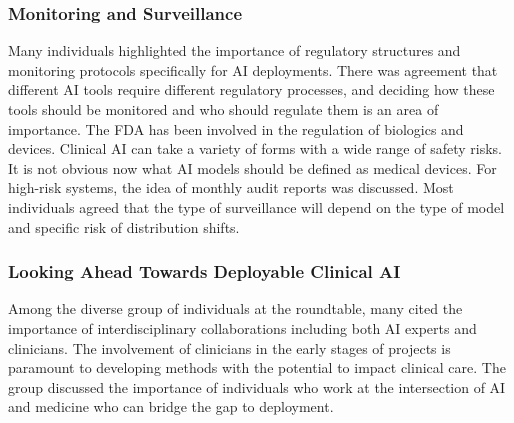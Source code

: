 \subsubsection{Monitoring and Surveillance}
Many individuals highlighted the importance of regulatory structures and monitoring protocols specifically for AI deployments. There was agreement that different AI tools require different regulatory processes, and deciding how these tools should be monitored and who should regulate them is an area of importance.  The FDA has been involved in the regulation of biologics and devices. Clinical AI can take a variety of forms with a wide range of safety risks. It is not obvious now what AI models should be defined as medical devices. For high-risk systems, the idea of monthly audit reports was discussed. Most individuals agreed that the type of surveillance will depend on the type of model and specific risk of distribution shifts. 

  
\subsubsection{Looking Ahead Towards Deployable Clinical AI}
Among the diverse group of individuals at the roundtable, many cited the importance of interdisciplinary collaborations including both AI experts and clinicians. The involvement of clinicians in the early stages of projects is paramount to developing methods with the potential to impact clinical care. The group discussed the importance of individuals who work at the intersection of AI and medicine who can bridge the gap to deployment. 


